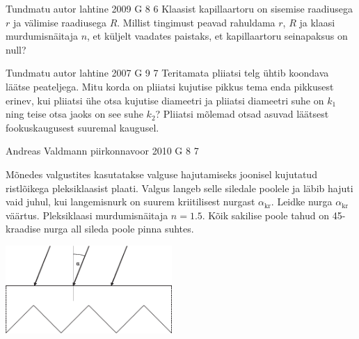 \documentclass[11pt, twoside]{article}
\begin{document}
{%
{Tundmatu autor} %
{lahtine} %
{2009} %
{G 8} %
{6} %
{
\ifStatement
Klaasist kapillaartoru on sisemise raadiusega $r$ ja välimise raadiusega $R$. Millist tingimust peavad rahuldama $r$, $R$ ja klaasi murdumisnäitaja $n$, et küljelt vaadates paistaks, et kapillaartoru seinapaksus on null?
\fi
}

{Tundmatu autor} %
{lahtine} %
{2007} %
{G 9} %
{7} %
{
\ifStatement
Teritamata pliiatsi telg ühtib koondava läätse peateljega. Mitu korda on pliiatsi kujutise pikkus tema enda pikkusest erinev, kui pliiatsi ühe otsa kujutise diameetri ja pliiatsi diameetri suhe on $k_1$ ning teise otsa jaoks on see suhe $k_2$? Pliiatsi mõlemad otsad asuvad läätsest fookuskaugusest suuremal kaugusel.
\fi
}

{Andreas Valdmann} %
{piirkonnavoor} %
{2010} %
{G 8} %
{7} %
{
\ifStatement
Mõnedes valgustites kasutatakse valguse hajutamiseks joonisel kujutatud ristlõikega
pleksiklaasist plaati. Valgus langeb selle siledale poolele ja läbib hajuti vaid juhul, kui
langemisnurk on suurem kriitilisest nurgast $\alpha_\mathrm{kr}$. Leidke nurga $\alpha_\mathrm{kr}$ väärtus. Pleksiklaasi
murdumisnäitaja $n=\num{1,5}$. Kõik sakilise poole tahud on \num{45}-kraadise nurga all sileda poole pinna
suhtes.
\begin{center}
	\includegraphics[width=0.475\textwidth]{2010-v2g-08-hajuti.eps}
\end{center}
\fi
}

}
\end{document}
